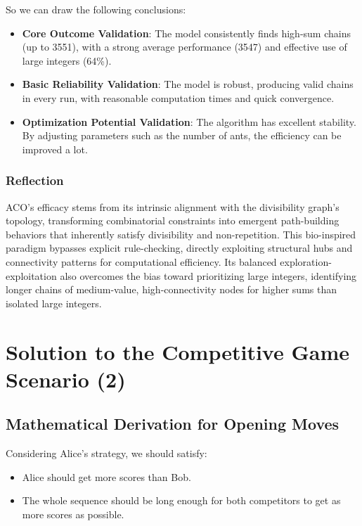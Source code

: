 \documentclass[twocolumn, a4paper]{article}
\begin{document}
So we can draw the following conclusions:
\begin{itemize}
    \item \textbf{Core Outcome Validation}: The model consistently finds high-sum chains (up to 3551), with a strong average performance (3547) and effective use of large integers (64\%).
    \item \textbf{Basic Reliability Validation}: The model is robust, producing valid chains in every run, with reasonable computation times and quick convergence.
    \item \textbf{Optimization Potential Validation}: The algorithm has excellent stability. By adjusting parameters such as the number of ants, the efficiency can be improved a lot.
\end{itemize}
\subsubsection{Reflection}
ACO's efficacy stems from its intrinsic alignment with the divisibility graph's topology, transforming combinatorial constraints into emergent path-building behaviors that inherently satisfy divisibility and non-repetition. This bio-inspired paradigm bypasses explicit rule-checking, directly exploiting structural hubs and connectivity patterns for computational efficiency. Its balanced exploration-exploitation also overcomes the bias toward prioritizing large integers, identifying longer chains of medium-value, high-connectivity nodes for higher sums than isolated large integers.





\section{Solution to the Competitive Game Scenario (2)}
\subsection{Mathematical Derivation for Opening Moves}

Considering Alice's strategy, we should satisfy: 
\begin{itemize}
    \item Alice should get more scores than Bob.
    \item The whole sequence should be long enough for both competitors to get as more scores as possible.
\end{itemize}
 
\end{document}
